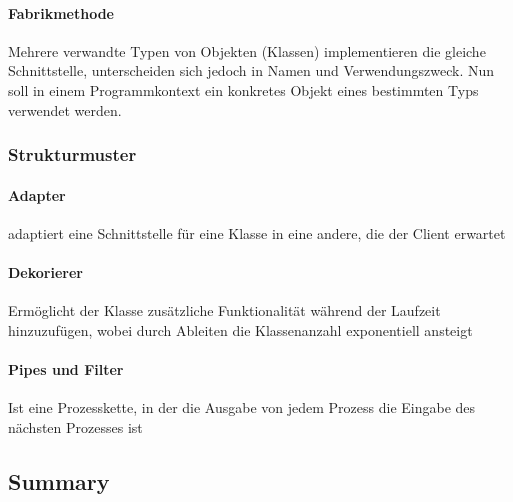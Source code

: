 \paragraph{Fabrikmethode}
Mehrere verwandte Typen von Objekten (Klassen) implementieren die gleiche Schnittstelle, unterscheiden sich jedoch in Namen und Verwendungszweck. Nun soll in einem Programmkontext ein konkretes Objekt eines bestimmten Typs verwendet werden.

\subsubsection{Strukturmuster}
\paragraph{Adapter}
adaptiert eine Schnittstelle für eine Klasse in eine andere, die der Client erwartet

\paragraph{Dekorierer}
Ermöglicht der Klasse zusätzliche Funktionalität während der Laufzeit hinzuzufügen, wobei durch Ableiten die Klassenanzahl exponentiell ansteigt

\paragraph{Pipes und Filter}
Ist eine Prozesskette, in der die Ausgabe von jedem Prozess die Eingabe des nächsten Prozesses ist


\subsection{Summary}
